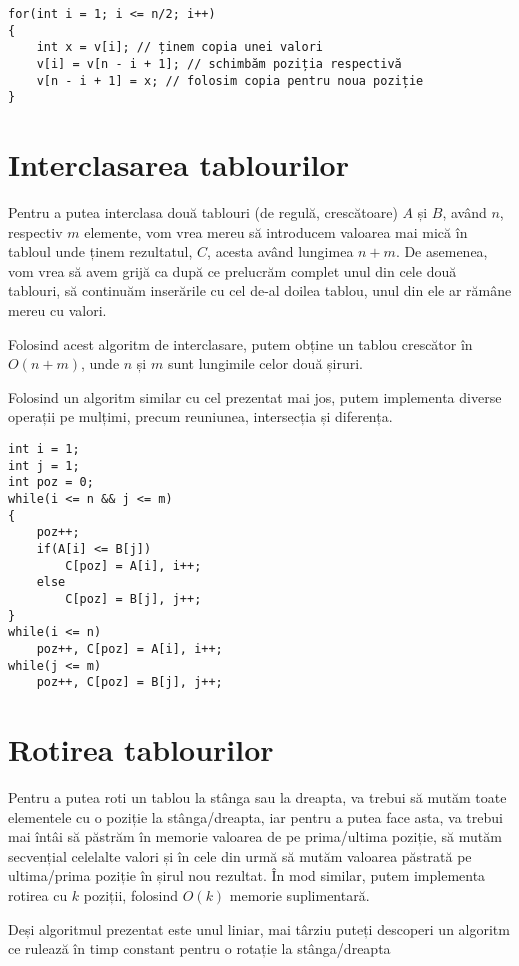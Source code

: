 \begin{verbatim}
for(int i = 1; i <= n/2; i++)
{
    int x = v[i]; // ținem copia unei valori
    v[i] = v[n - i + 1]; // schimbăm poziția respectivă
    v[n - i + 1] = x; // folosim copia pentru noua poziție
}
\end{verbatim}

\section{Interclasarea tablourilor}

Pentru a putea interclasa două tablouri (de regulă, crescătoare) $A$ și $B$, având $n$, respectiv $m$ elemente, vom vrea mereu să introducem valoarea mai mică în tabloul unde ținem rezultatul, $C$, acesta având lungimea $n + m$. De asemenea, vom vrea să avem grijă ca după ce prelucrăm complet unul din cele două tablouri, să continuăm inserările cu cel de-al doilea tablou, unul din ele ar rămâne mereu cu valori. 

\begin{observation}
Folosind acest algoritm de interclasare, putem obține un tablou crescător în $O(n + m)$, unde $n$ și $m$ sunt lungimile celor două șiruri. 
\end{observation}

\begin{observation}
Folosind un algoritm similar cu cel prezentat mai jos, putem implementa diverse operații pe mulțimi, precum reuniunea, intersecția și diferența.
\end{observation}

\begin{verbatim}
int i = 1; 
int j = 1;
int poz = 0;
while(i <= n && j <= m)
{
    poz++;
    if(A[i] <= B[j])
        C[poz] = A[i], i++;
    else
        C[poz] = B[j], j++;
}
while(i <= n)
    poz++, C[poz] = A[i], i++;
while(j <= m)   
    poz++, C[poz] = B[j], j++;
\end{verbatim}

\section{Rotirea tablourilor}

Pentru a putea roti un tablou la stânga sau la dreapta, va trebui să mutăm toate elementele cu o poziție la stânga/dreapta, iar pentru a putea face asta, va trebui mai întâi să păstrăm în memorie valoarea de pe prima/ultima poziție, să mutăm secvențial celelalte valori și în cele din urmă să mutăm valoarea păstrată pe ultima/prima poziție în șirul nou rezultat. În mod similar, putem implementa rotirea cu $k$ poziții, folosind $O(k)$ memorie suplimentară. 

\begin{observation}
Deși algoritmul prezentat este unul liniar, mai târziu puteți descoperi un algoritm ce rulează în timp constant pentru o rotație la stânga/dreapta %
\end{observation}